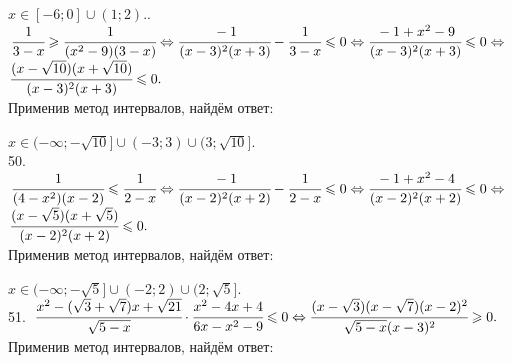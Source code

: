\documentclass[12pt]{article}
\begin{document}
$x\in[-6;0]\cup(1;2).$\newpage{}. $\cfrac{1}{3-x}\geqslant\cfrac{1}{(x^2-9)(3-x)}\Leftrightarrow\cfrac{-1}{(x-3)^2(x+3)}-\cfrac{1}{3-x}\leqslant0\Leftrightarrow
\cfrac{-1+x^2-9}{(x-3)^2(x+3)}\leqslant0\Leftrightarrow$\\$\cfrac{(x-\sqrt{10})(x+\sqrt{10})}{(x-3)^2(x+3)}\leqslant0.$\\ Применив метод интервалов, найдём ответ:
\begin{figure}[ht!]
\end{figure}
$x\in(-\infty;-\sqrt{10}]\cup(-3;3)\cup(3;\sqrt{10}].$\\
50. $\cfrac{1}{(4-x^2)(x-2)}\leqslant\cfrac{1}{2-x} \Leftrightarrow\cfrac{-1}{(x-2)^2(x+2)}-\cfrac{1}{2-x}\leqslant0\Leftrightarrow
\cfrac{-1+x^2-4}{(x-2)^2(x+2)}\leqslant0\Leftrightarrow$\\$\cfrac{(x-\sqrt{5})(x+\sqrt{5})}{(x-2)^2(x+2)}\leqslant0.$\\ Применив метод интервалов, найдём ответ:
\begin{figure}[ht!]
\end{figure}
$x\in(-\infty;-\sqrt{5}]\cup(-2;2)\cup(2;\sqrt{5}].$\\
51. $\cfrac{x^2-(\sqrt{3}+\sqrt{7})x+\sqrt{21}}{\sqrt{5-x}}\cdot\cfrac{x^2-4x+4}{6x-x^2-9}\leqslant 0\Leftrightarrow
\cfrac{(x-\sqrt{3})(x-\sqrt{7})(x-2)^2}{\sqrt{5-x}(x-3)^2}\geqslant 0.$ Применив метод интервалов, найдём ответ:
\begin{figure}[ht!]
\end{figure}
\end{document}
